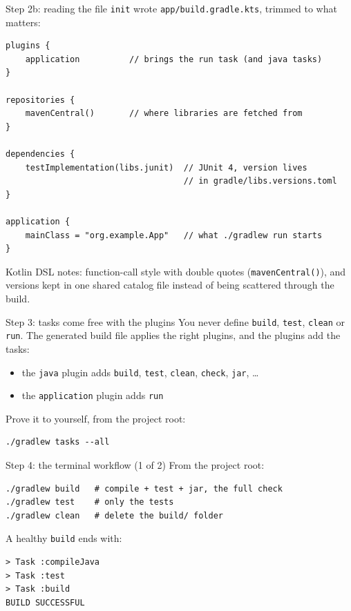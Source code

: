 \documentclass[11pt,aspectratio=169]{beamer}
\begin{document}
\begin{frame}[fragile]{Step 2b: reading the file \texttt{init} wrote}
  \texttt{app/build.gradle.kts}, trimmed to what matters:
  \begin{lstlisting}
plugins {
    application          // brings the run task (and java tasks)
}

repositories {
    mavenCentral()       // where libraries are fetched from
}

dependencies {
    testImplementation(libs.junit)  // JUnit 4, version lives
                                    // in gradle/libs.versions.toml
}

application {
    mainClass = "org.example.App"   // what ./gradlew run starts
}
  \end{lstlisting}
  Kotlin DSL notes: function-call style with double quotes
  (\texttt{mavenCentral()}), and versions kept in one shared catalog
  file instead of being scattered through the build.
\end{frame}

\begin{frame}[fragile]{Step 3: tasks come free with the plugins}
  You never define \texttt{build}, \texttt{test}, \texttt{clean} or
  \texttt{run}. The generated build file applies the right plugins, and
  the plugins add the tasks:
  \begin{itemize}
    \item the \texttt{java} plugin adds \texttt{build}, \texttt{test},
      \texttt{clean}, \texttt{check}, \texttt{jar}, \ldots
    \item the \texttt{application} plugin adds \texttt{run}
  \end{itemize}
  Prove it to yourself, from the project root:
  \begin{lstlisting}
./gradlew tasks --all
  \end{lstlisting}
\end{frame}

\begin{frame}[fragile]{Step 4: the terminal workflow (1 of 2)}
  From the project root:
  \begin{lstlisting}
./gradlew build   # compile + test + jar, the full check
./gradlew test    # only the tests
./gradlew clean   # delete the build/ folder
  \end{lstlisting}
  A healthy \texttt{build} ends with:
  \begin{lstlisting}
> Task :compileJava
> Task :test
> Task :build
BUILD SUCCESSFUL
  \end{lstlisting}
\end{frame}
\end{document}
